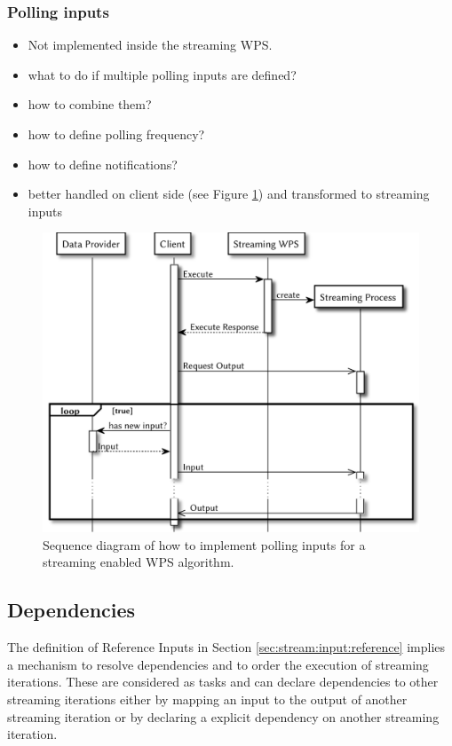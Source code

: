 		\subsubsection{Polling inputs}
			\label{sec:stream:input:polling}
			\begin{itemize}
				\item Not implemented inside the streaming WPS.
				\item what to do if multiple polling inputs are defined?
				\item how to combine them?
				\item how to define polling frequency?
				\item how to define notifications?
				\item better handled on client side (see Figure \ref{fig:sd:polling}) and transformed to streaming inputs
			\end{itemize}
			\begin{figure}[!htb]
				\centering
				\includegraphics[width=.7868\textwidth]{figures/sequence-diagramm-polling.pdf}
				\caption{\label{fig:sd:polling} Sequence diagram of how to implement polling inputs for a streaming enabled WPS algorithm.}
			\end{figure}

	\subsection{Dependencies}
		\label{sec:stream:dependencies}
		The definition of Reference Inputs in Section \ref{sec:stream:input:reference} implies a mechanism to resolve dependencies and to order the execution of streaming iterations. These are considered as tasks and can declare dependencies to other streaming iterations either by mapping an input to the output of another streaming iteration or by declaring a explicit dependency on another streaming iteration.


